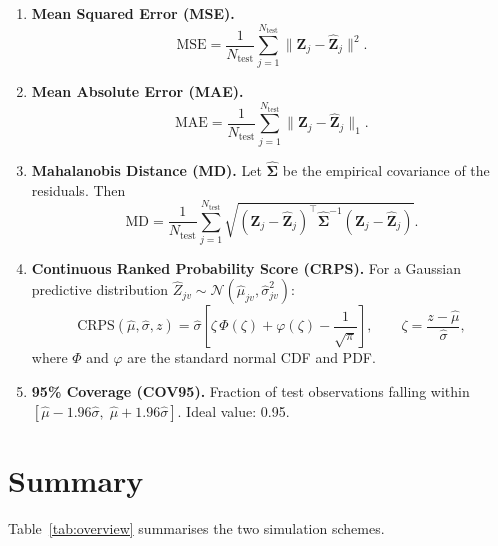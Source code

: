 \documentclass[11pt,a4paper]{article}
\newcommand{\bSigma}{\bm{\Sigma}}
\begin{document}
\begin{enumerate}[leftmargin=*]
  \item \textbf{Mean Squared Error (MSE).}
    \[
      \text{MSE} = \frac{1}{N_{\text{test}}}
        \sum_{j=1}^{N_{\text{test}}} \|\bm{Z}_j - \hat{\bm{Z}}_j\|^2.
    \]

  \item \textbf{Mean Absolute Error (MAE).}
    \[
      \text{MAE} = \frac{1}{N_{\text{test}}}
        \sum_{j=1}^{N_{\text{test}}} \|\bm{Z}_j - \hat{\bm{Z}}_j\|_1.
    \]

  \item \textbf{Mahalanobis Distance (MD).}
    Let $\hat{\bSigma}$ be the empirical covariance of the residuals.  Then
    \[
      \text{MD} = \frac{1}{N_{\text{test}}}
        \sum_{j=1}^{N_{\text{test}}}
        \sqrt{(\bm{Z}_j-\hat{\bm{Z}}_j)^\top
              \hat{\bSigma}^{-1}
              (\bm{Z}_j-\hat{\bm{Z}}_j)}.
    \]

  \item \textbf{Continuous Ranked Probability Score (CRPS).}
    For a Gaussian predictive distribution
    $\hat{Z}_{jv}\sim\mathcal{N}(\hat\mu_{jv},\hat\sigma_{jv}^2)$:
    \[
      \text{CRPS}(\hat\mu,\hat\sigma,z)
      = \hat\sigma\!\left[
          \zeta\,\Phi(\zeta) + \varphi(\zeta) - \frac{1}{\sqrt\pi}
        \right],
      \qquad \zeta = \frac{z-\hat\mu}{\hat\sigma},
    \]
    where $\Phi$ and $\varphi$ are the standard normal CDF and PDF.

  \item \textbf{95\% Coverage (COV95).}
    Fraction of test observations falling within
    $[\hat\mu - 1.96\hat\sigma,\;\hat\mu + 1.96\hat\sigma]$.
    Ideal value: 0.95.
\end{enumerate}

\section{Summary}

Table~\ref{tab:overview} summarises the two simulation schemes.
\end{document}
